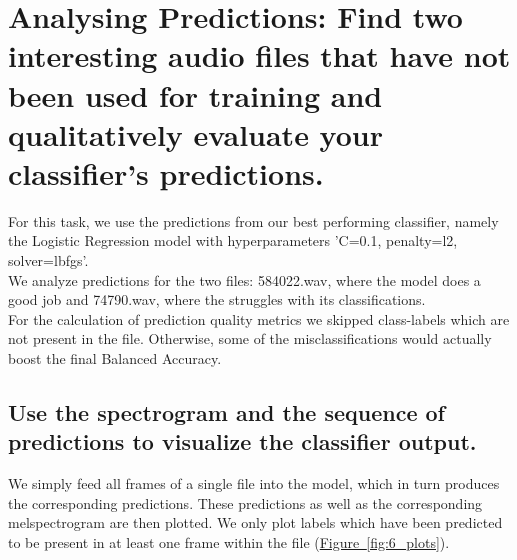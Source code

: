 
\section{Analysing Predictions: {\normalfont\normalsize Find two interesting audio files that have not been used for training and qualitatively evaluate your classifier’s predictions.}}
\label{sec:Analysing Predictions}

For this task, we use the predictions from our best performing classifier, namely the Logistic Regression model with hyperparameters 'C=0.1, penalty=l2, solver=lbfgs'.\\
We analyze predictions for the two files: 584022.wav, where the model does a good job and 74790.wav, where the struggles with its classifications. \\
For the calculation of prediction quality metrics we skipped class-labels which are not present in the file. Otherwise, some of the misclassifications would actually boost the final Balanced Accuracy.


\subsection{Use the spectrogram and the sequence of predictions to visualize the classifier output. }
\label{sec:Analysing Predictions:a}
We simply feed all frames of a single file into the model, which in turn produces the corresponding predictions. These predictions as well as the corresponding melspectrogram are then plotted. We only plot labels which have been predicted to be present in at least one frame within the file (\hyperref[fig:6_plots]{Figure~\ref*{fig:6_plots}}).

